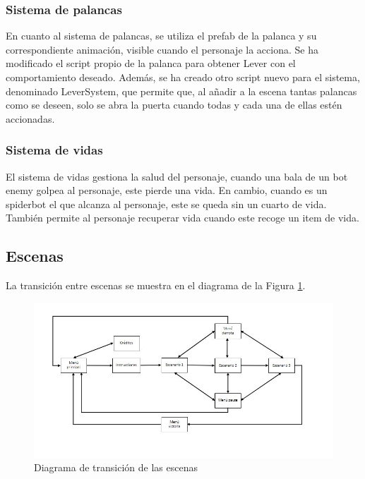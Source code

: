 \subsubsection{Sistema de palancas}
En cuanto al sistema de palancas, se utiliza el prefab de la palanca y su correspondiente animación, visible cuando el personaje la acciona. Se ha modificado el script propio de la palanca para obtener Lever con el comportamiento deseado. Además, se ha creado otro script nuevo para el sistema, denominado LeverSystem, que permite que, al añadir a la escena tantas palancas como se deseen, solo se abra la puerta cuando todas y cada una de ellas estén accionadas.

\subsubsection{Sistema de vidas}
El sistema de vidas gestiona la salud del personaje, cuando una bala de un bot enemy golpea al personaje, este pierde una vida. En cambio, cuando es un spiderbot el que alcanza al personaje, este se queda sin un cuarto de vida. También permite al personaje recuperar vida cuando este recoge un item de vida.


\subsection{Escenas}

La transición entre escenas se muestra en el diagrama de la Figura \ref{fig:TrasicionEscenas3D}. 

\begin{figure}[H]
	\centering
	\includegraphics[scale=0.60]{imagenes/transicionEscenas3D.png}
	\caption{\label{fig:TrasicionEscenas3D}Diagrama de transición de las escenas}
\end{figure}


